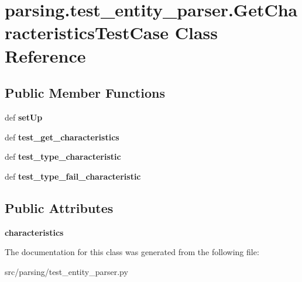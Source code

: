 \hypertarget{classparsing_1_1test__entity__parser_1_1_get_characteristics_test_case}{\section{parsing.\-test\-\_\-entity\-\_\-parser.\-Get\-Characteristics\-Test\-Case \-Class \-Reference}
\label{classparsing_1_1test__entity__parser_1_1_get_characteristics_test_case}
}
\subsection*{\-Public \-Member \-Functions}
\begin{DoxyCompactItemize}
\item 
\hypertarget{classparsing_1_1test__entity__parser_1_1_get_characteristics_test_case_a5047fbc72b7bf724e69c7cb16ac19e63}{def {\bfseries set\-Up}}\label{classparsing_1_1test__entity__parser_1_1_get_characteristics_test_case_a5047fbc72b7bf724e69c7cb16ac19e63}

\item 
\hypertarget{classparsing_1_1test__entity__parser_1_1_get_characteristics_test_case_a9712a8c3a0fb22c4a8c19196c39b3031}{def {\bfseries test\-\_\-get\-\_\-characteristics}}\label{classparsing_1_1test__entity__parser_1_1_get_characteristics_test_case_a9712a8c3a0fb22c4a8c19196c39b3031}

\item 
\hypertarget{classparsing_1_1test__entity__parser_1_1_get_characteristics_test_case_a8d19731aeed4d2051ddd2614ab52328f}{def {\bfseries test\-\_\-type\-\_\-characteristic}}\label{classparsing_1_1test__entity__parser_1_1_get_characteristics_test_case_a8d19731aeed4d2051ddd2614ab52328f}

\item 
\hypertarget{classparsing_1_1test__entity__parser_1_1_get_characteristics_test_case_af69862c5e8a1cd785ad51e31ccca8d42}{def {\bfseries test\-\_\-type\-\_\-fail\-\_\-characteristic}}\label{classparsing_1_1test__entity__parser_1_1_get_characteristics_test_case_af69862c5e8a1cd785ad51e31ccca8d42}

\end{DoxyCompactItemize}
\subsection*{\-Public \-Attributes}
\begin{DoxyCompactItemize}
\item 
\hypertarget{classparsing_1_1test__entity__parser_1_1_get_characteristics_test_case_a22475ae1c4beaa665698deca555b540d}{{\bfseries characteristics}}\label{classparsing_1_1test__entity__parser_1_1_get_characteristics_test_case_a22475ae1c4beaa665698deca555b540d}

\end{DoxyCompactItemize}


\-The documentation for this class was generated from the following file\-:\begin{DoxyCompactItemize}
\item 
src/parsing/test\-\_\-entity\-\_\-parser.\-py\end{DoxyCompactItemize}

